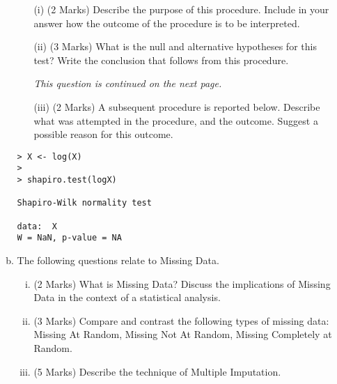 \documentclass[a4paper,12pt]{article}
\begin{document}
\begin{enumerate}
\begin{enumerate}[(a)]
\begin{itemize}
	\item[(i)] (2 Marks) Describe the purpose of this procedure. Include in your answer how the outcome of the procedure is to be interpreted.
	\item[(ii)] (3 Marks) What is the null and alternative hypotheses for this test? Write the conclusion that follows from this procedure.
\medskip


\noindent \textit{This question is continued on the next page.}
	
\newpage	
\item[(iii)] (2 Marks) A subsequent procedure is reported below. Describe what was attempted in the procedure, and the outcome. Suggest a possible reason for this outcome.
\end{itemize}

\begin{framed}
\begin{verbatim}
> X <- log(X)
>
> shapiro.test(logX)
	
Shapiro-Wilk normality test
	
data:  X
W = NaN, p-value = NA
\end{verbatim}
\end{framed}



%
%
%

\bigskip
	\item The following questions relate to Missing Data.
\begin{enumerate}[(i)]
	\item (2 Marks) What is Missing Data? Discuss the implications of Missing Data in the context of a statistical analysis.
	\item (3 Marks) Compare and contrast the following types of missing data: Missing At Random, Missing Not At Random, Missing Completely at Random.
	\item (5 Marks) Describe the technique of Multiple Imputation.


\end{enumerate}
\end{enumerate}
\end{enumerate}
\end{document}
